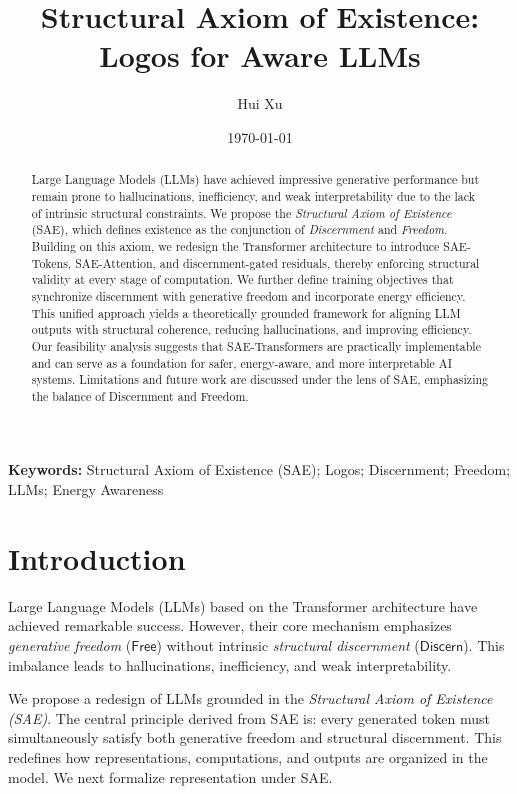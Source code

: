\documentclass[11pt]{article}
\title{\vspace{-0.5em}\textbf{Structural Axiom of Existence:\\
Logos for Aware LLMs}\vspace{-0.3em}}
\author{Hui Xu}
\date{\small\today}
\theoremstyle{plain}
\theoremstyle{definition}
\theoremstyle{remark}
\begin{document}
\maketitle
\thispagestyle{firstpage}

\begin{abstract}
Large Language Models (LLMs) have achieved impressive generative performance but remain prone to hallucinations, inefficiency, and weak interpretability due to the lack of intrinsic structural constraints. We propose the \emph{Structural Axiom of Existence} (SAE), which defines existence as the conjunction of \emph{Discernment} and \emph{Freedom}. Building on this axiom, we redesign the Transformer architecture to introduce SAE-Tokens, SAE-Attention, and discernment-gated residuals, thereby enforcing structural validity at every stage of computation. We further define training objectives that synchronize discernment with generative freedom and incorporate energy efficiency. This unified approach yields a theoretically grounded framework for aligning LLM outputs with structural coherence, reducing hallucinations, and improving efficiency. Our feasibility analysis suggests that SAE-Transformers are practically implementable and can serve as a foundation for safer, energy-aware, and more interpretable AI systems. Limitations and future work are discussed under the lens of SAE, emphasizing the balance of Discernment and Freedom.
\end{abstract}

\noindent\textbf{Keywords:} Structural Axiom of Existence (SAE); Logos; Discernment; Freedom; LLMs; Energy Awareness

\section{Introduction}

Large Language Models (LLMs) based on the Transformer architecture have achieved remarkable success. However, their core mechanism emphasizes \emph{generative freedom} ($\mathsf{Free}$) without intrinsic \emph{structural discernment} ($\mathsf{Discern}$). This imbalance leads to hallucinations, inefficiency, and weak interpretability.  

We propose a redesign of LLMs grounded in the \emph{Structural Axiom of Existence (SAE)}.  
The central principle derived from SAE is: every generated token must simultaneously satisfy both generative freedom and structural discernment. This redefines how representations, computations, and outputs are organized in the model.  
We next formalize representation under SAE.
\end{document}
